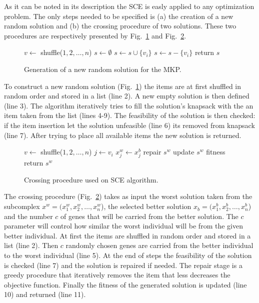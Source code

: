 \documentclass[10pt,conference, compsocconf]{IEEEtran}
\begin{document}
As it can be noted in its description the SCE is easly applied to any
optimization problem.
The only steps needed to be specified is (a) the creation of a new random
solution and (b) the crossing procedure of two solutions.
These two procedures are respectively presented by Fig.~\ref{alg:new} and
Fig.~\ref{alg:cross}.

\begin{figure}
\begin{algorithmic}[1]
    \State $v \leftarrow $ shuffle($1, 2, \ldots, n$)
	\State $s \leftarrow \emptyset$ 
	  \State $s \leftarrow s \cup \{v_i\}$ 
	   
	    \State $s \leftarrow s - \{v_i\}$
      \EndIf
	\EndFor
  \State return $s$
  \EndProcedure
\end{algorithmic}
\caption{Generation of a new random solution for the MKP.}
\label{alg:new}
\end{figure}

To construct a new random solution (Fig.~\ref{alg:new}) the items are
at first shuffled in random order and stored in a list (line 2).
A new empty solution is then defined (line 3).
The algorithm iteratively tries to fill the solution's knapsack with 
the an item taken from the list (lines 4-9).
The feasibility of the solution is then checked: if the item insertion let
the solution unfeasible (line 6) its removed from knapsack (line 7).
After trying to place all available items the new solution is returned.

\begin{figure}
\begin{algorithmic}[1]
    \State $v \leftarrow $ shuffle($1, 2, \ldots, n$)
	  \State $j \leftarrow v_i$
	  \State $x^w_j \leftarrow x^b_j$ 
	\EndFor
	  \State repair $s^w$
	\EndIf
	\State update $s^w$ fitness
  \State return $s^w$
  \EndProcedure
\end{algorithmic}
\caption{Crossing procedure used on SCE algorithm.}
\label{alg:cross}
\end{figure}

The crossing procedure (Fig.~\ref{alg:cross}) takes as input the worst
solution taken from the subcomplex $x^w = (x^w_1, x^w_2, \ldots, x^w_n$),
the selected better solution $x_b = (x^b_1, x^b_2, \ldots, x^b_n$)
and the number $c$ of genes that will be carried from the better solution.
The $c$ parameter will control how similar the worst individual will be from the
given better individual.
At first the items are shuffled in random order and stored in a list (line 2).
Then $c$ randomly chosen genes are carried from the better individual to the worst
individual (line 5).
At the end of steps the feasibility of the solution is checked (line 7) and
the solution is repaired if needed.
The repair stage is a greedy procedure that iteratively removes the item that less
decreases the objective function.
Finally the fitness of the generated solution is updated (line 10) and
returned (line 11).
\end{document}
